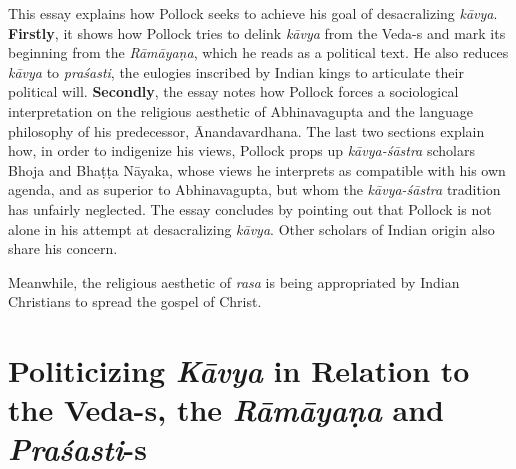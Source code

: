 This essay explains how Pollock seeks to achieve his goal of desacralizing \textsl{kāvya}. \textbf{Firstly}, it shows how Pollock tries to delink \textsl{kāvya} from the Veda-s and mark its beginning from the \textsl{Rāmāyaṇa}, which he reads as a political text. He also reduces \textsl{kāvya} to \textsl{praśasti}, the eulogies inscribed by Indian kings to articulate their political will. \textbf{Secondly}, the essay notes how Pollock forces a sociological interpretation on the religious aesthetic of Abhinavagupta and the language philosophy of his predecessor, Ānandavardhana. The last two sections explain how, in order to indigenize his views, Pollock props up \textsl{kāvya-śāstra} scholars Bhoja and Bhaṭṭa Nāyaka, whose views he interprets as compatible with his own agenda, and as superior to Abhinavagupta, but whom the \textsl{kāvya-śāstra} tradition has unfairly neglected. The essay concludes by pointing out that Pollock is not alone in his attempt at desacralizing \textsl{kāvya}. Other scholars of Indian origin also share his concern. 

Meanwhile, the religious aesthetic of \textsl{rasa} is being appropriated by Indian Christians to spread the gospel of Christ.

\section*{Politicizing {\sl\bfseries Kāvya} in Relation to the Veda-s, the {\sl\bfseries Rāmāyaṇa} and {\sl\bfseries Praśasti}-s}

